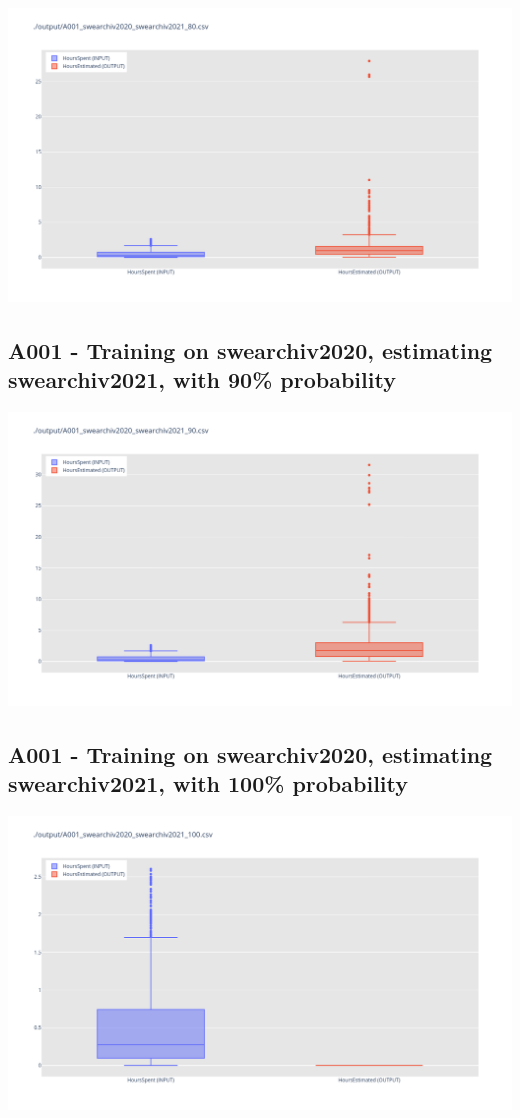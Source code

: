 \includegraphics[width=\textwidth]{Scripts/output/A001_swearchiv2020_swearchiv2021_80.csv.png}

\newpage

\subsection{A001 - Training on swearchiv2020, estimating swearchiv2021, with 90\% probability}

\includegraphics[width=\textwidth]{Scripts/output/A001_swearchiv2020_swearchiv2021_90.csv.png}

\newpage

\subsection{A001 - Training on swearchiv2020, estimating swearchiv2021, with 100\% probability}

\includegraphics[width=\textwidth]{Scripts/output/A001_swearchiv2020_swearchiv2021_100.csv.png}



